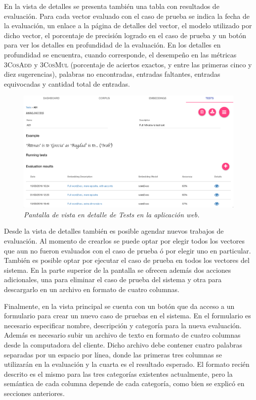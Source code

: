 En la vista de detalles se presenta también una tabla con resultados de evaluación. Para cada vector
evaluado con el caso de prueba se indica la fecha de la evaluación, un enlace a la página de detalles del
vector, el modelo utilizado por dicho vector, el porcentaje de precisión logrado en el caso de prueba y
un botón para ver los detalles en profundidad de la evaluación. En los detalles en profundidad se
encuentra, cuando corresponde, el desempeño en las métricas \textsc{3CosAdd} y \textsc{3CosMul}
(porcentaje de aciertos exactos, y entre las primeras cinco y diez sugerencias), palabras no encontradas,
entradas faltantes, entradas equivocadas y cantidad total de entradas.

\begin{figure}[h]
    \centering
    \includegraphics[width=\textwidth]{images/ui-nabu-tests-detail}
    \caption{\textit{Pantalla de vista en detalle de Tests en la aplicación web.}}
    \label{fig:ui-nabu-tests-detail}
\end{figure}

Desde la vista de detalles también es posible agendar nuevos trabajos de evaluación. Al momento de
crearlos se puede optar por elegir todos los vectores que aun no fueron evaluados con el caso de prueba
ó por elegir uno en particular. También es posible optar por ejecutar el caso de prueba en todos los
vectores del sistema. En la parte superior de la pantalla se ofrecen además dos acciones adicionales,
una para eliminar el caso de prueba del sistema y otra para descargarlo en un archivo en formato de
cuatro columnas.

Finalmente, en la vista principal se cuenta con un botón que da acceso a un formulario para crear un
nuevo caso de pruebas en el sistema. En el formulario es necesario especificar nombre, descripción y
categoría para la nueva evaluación. Además es necesario subir un archivo de texto en formato de cuatro
columnas desde la computadora del cliente. Dicho archivo debe contener cuatro palabras separadas por un
espacio por línea, donde las primeras tres columnas se utilizarán en la evaluación y la cuarta es el
resultado esperado. El formato recién descrito es el mismo para las tres categorías existentes
actualmente, pero la semántica de cada columna depende de cada categoría, como bien se explicó en
secciones anteriores.


